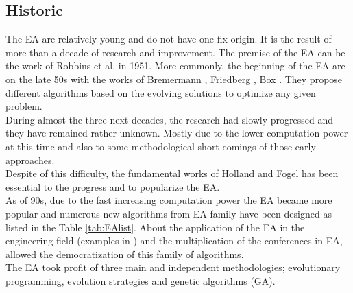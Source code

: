 \subsection{Historic}

The EA are relatively young and do not have one fix origin. It is the result of more than a decade of research and improvement.
The premise of the EA can be the work of Robbins et al.  \cite{184*robbins1951} in 1951. 
More commonly, the beginning of the EA are on the late 50s with the works of Bremermann \cite{185*bremermann1962}, Friedberg \cite{186*friedberg1958}, Box \cite{187*box1957}. They propose different algorithms based on the evolving solutions to optimize any given problem.\\ 
During almost the three next decades, the research had slowly progressed and they have remained rather unknown. Mostly due to the lower computation power at this time and also to some methodological short comings of
those early approaches. \\
Despite of this difficulty, the fundamental works of Holland \cite{111*Holland1962}  and Fogel  has been essential to the progress and to popularize the EA. \\
As of 90s, due to the fast increasing computation power the EA became more popular and numerous new algorithms from EA family have been designed  as listed in the Table \ref{tab:EAlist}. About the application of the EA in the engineering field (examples in \cite{10in182*alander1994}) and the multiplication of the conferences in EA, allowed the democratization of this family of algorithms.\\
The EA  took profit of three main and independent methodologies; evolutionary programming, evolution strategies and genetic algorithms (GA). 

